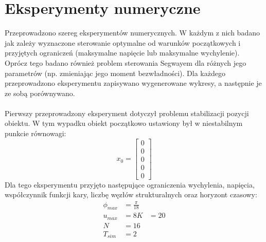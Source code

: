 \section{Eksperymenty numeryczne}
\label{sec:eksperymenty_numeryczne}

Przeprowadzono szereg eksperymentów numerycznych. W każdym z nich badano jak zależy wyznaczone sterowanie optymalne od warunków początkowych i przyjętych ograniczeń (maksymalne napięcie lub maksymalne wychylenie). Oprócz tego badano również problem sterowania Segwayem dla różnych jego parametrów (np. zmieniając jego moment bezwładności). Dla każdego przeprowadzono eksperymentu zapisywano wygenerowane wykresy, a następnie je ze sobą porównywano.
\paragraph*{}
Pierwszy przeprowadzony eksperyment dotyczył problemu stabilizacji pozycji obiektu. W tym wypadku obiekt początkowo ustawiony był w niestabilnym punkcie równowagi:
\begin{equation}
x_0=\begin{bmatrix}
0\\
0\\
0\\
0\\
0
\end{bmatrix}
\end{equation}
Dla tego eksperymentu przyjęto następujące ograniczenia wychylenia, napięcia, współczynnik funkcji kary, liczbę węzłów strukturalnych oraz horyzont czasowy:
\begin{equation}
\begin{aligned}
\phi_{max}&=\frac{\pi}{18}\\
u_{max}&=8
K&=20\\
N&=16\\
T_{sim}&=2
\end{aligned}
\end{equation}

